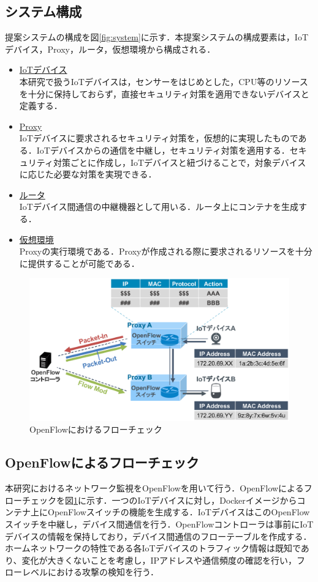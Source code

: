 \documentclass[Japanese]{dicomopapers}
\begin{document}
\subsection{システム構成}
提案システムの構成を図\ref{fig:system}に示す．本提案システムの構成要素は，IoTデバイス，Proxy，ルータ，仮想環境から構成される．
\begin{itemize}
	\item \underline{IoTデバイス}\mbox{}\\
	      本研究で扱うIoTデバイスは，センサーをはじめとした，CPU等のリソースを十分に保持しておらず，直接セキュリティ対策を適用できないデバイスと定義する．
	\item \underline{Proxy}\mbox{}\\
	      IoTデバイスに要求されるセキュリティ対策を，仮想的に実現したものである．IoTデバイスからの通信を中継し，セキュリティ対策を適用する．セキュリティ対策ごとに作成し，IoTデバイスと紐づけることで，対象デバイスに応じた必要な対策を実現できる．
	\item \underline{ルータ}\mbox{}\\
	      IoTデバイス間通信の中継機器として用いる．ルータ上にコンテナを生成する．
	\item \underline{仮想環境}\mbox{}\\
	      Proxyの実行環境である．Proxyが作成される際に要求されるリソースを十分に提供することが可能である．
\end{itemize}

\begin{figure}[!tb]
	\centering
	\includegraphics[width=\linewidth]{img/openflow.eps}
	\caption{OpenFlowにおけるフローチェック}
	\label{fig:openflow}
\end{figure}

\subsection{OpenFlowによるフローチェック}
本研究におけるネットワーク監視をOpenFlowを用いて行う．OpenFlowによるフローチェックを図\ref{fig:openflow}に示す．一つのIoTデバイスに対し，Dockerイメージからコンテナ上にOpenFlowスイッチの機能を生成する．IoTデバイスはこのOpenFlowスイッチを中継し，デバイス間通信を行う．OpenFlowコントローラは事前にIoTデバイスの情報を保持しており，デバイス間通信のフローテーブルを作成する．ホームネットワークの特性である各IoTデバイスのトラフィック情報は既知であり、変化が大きくないことを考慮し，IPアドレスや通信頻度の確認を行い，フローレベルにおける攻撃の検知を行う．
\end{document}
